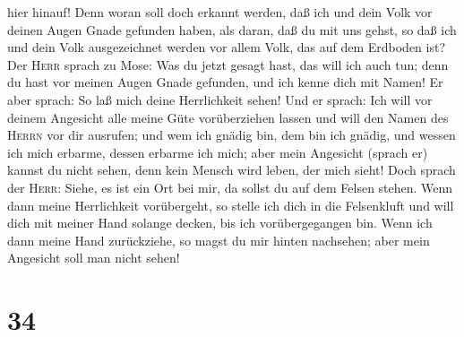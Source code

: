 hier hinauf!  Denn woran soll doch erkannt werden, daß
ich und dein Volk vor deinen Augen Gnade gefunden haben, als daran, daß
du mit uns gehst, so daß ich und dein Volk ausgezeichnet werden vor
allem Volk, das auf dem Erdboden ist?  Der \textsc{Herr}
sprach zu Mose: Was du jetzt gesagt hast, das will ich auch tun; denn du
hast vor meinen Augen Gnade gefunden, und ich kenne dich mit Namen!
 Er aber sprach: So laß mich deine Herrlichkeit sehen!
 Und er sprach: Ich will vor deinem Angesicht alle meine
Güte vorüberziehen lassen und will den Namen des \textsc{Herrn} vor dir
ausrufen; und wem ich gnädig bin, dem bin ich gnädig, und wessen ich
mich erbarme, dessen erbarme ich mich;  aber mein
Angesicht (sprach er) kannst du nicht sehen, denn kein Mensch wird
leben, der mich sieht!  Doch sprach der \textsc{Herr}:
Siehe, es ist ein Ort bei mir, da sollst du auf dem Felsen stehen.
 Wenn dann meine Herrlichkeit vorübergeht, so stelle ich
dich in die Felsenkluft und will dich mit meiner Hand solange decken,
bis ich vorübergegangen bin.  Wenn ich dann meine Hand
zurückziehe, so magst du mir hinten nachsehen; aber mein Angesicht soll
man nicht sehen!

\hypertarget{section-33}{%
\section{34}\label{section-33}}

